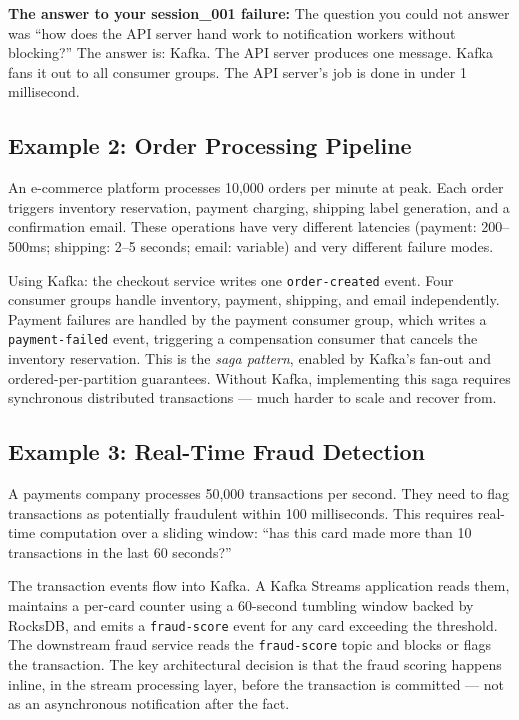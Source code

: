 \documentclass[11pt,a4paper]{article}
\begin{document}
\textbf{The answer to your session\_001 failure:} The question you could not answer was ``how does the API server hand work to notification workers without blocking?'' The answer is: Kafka. The API server produces one message. Kafka fans it out to all consumer groups. The API server's job is done in under 1 millisecond.

\subsection{Example 2: Order Processing Pipeline}

An e-commerce platform processes 10,000 orders per minute at peak. Each order triggers inventory reservation, payment charging, shipping label generation, and a confirmation email. These operations have very different latencies (payment: 200--500ms; shipping: 2--5 seconds; email: variable) and very different failure modes.

Using Kafka: the checkout service writes one \texttt{order-created} event. Four consumer groups handle inventory, payment, shipping, and email independently. Payment failures are handled by the payment consumer group, which writes a \texttt{payment-failed} event, triggering a compensation consumer that cancels the inventory reservation. This is the \textit{saga pattern}, enabled by Kafka's fan-out and ordered-per-partition guarantees. Without Kafka, implementing this saga requires synchronous distributed transactions --- much harder to scale and recover from.

\subsection{Example 3: Real-Time Fraud Detection}

A payments company processes 50,000 transactions per second. They need to flag transactions as potentially fraudulent within 100 milliseconds. This requires real-time computation over a sliding window: ``has this card made more than 10 transactions in the last 60 seconds?''

The transaction events flow into Kafka. A Kafka Streams application reads them, maintains a per-card counter using a 60-second tumbling window backed by RocksDB, and emits a \texttt{fraud-score} event for any card exceeding the threshold. The downstream fraud service reads the \texttt{fraud-score} topic and blocks or flags the transaction. The key architectural decision is that the fraud scoring happens inline, in the stream processing layer, before the transaction is committed --- not as an asynchronous notification after the fact.
\end{document}
